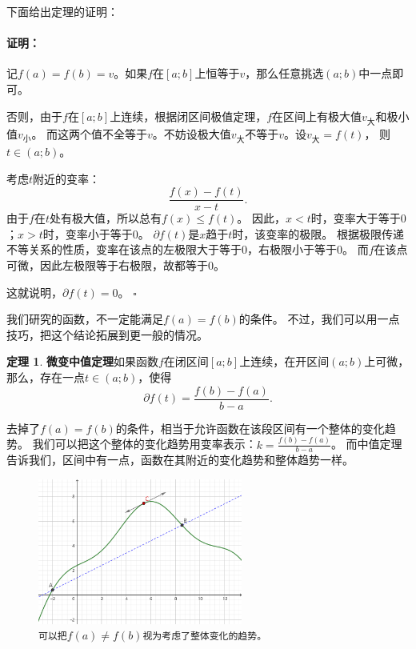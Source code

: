 \documentclass[12pt,UTF8]{ctexbook}
\theoremstyle{definition}
\newtheorem{tm}{定理}[section]
\theoremstyle{plain}
\renewenvironment{proof}{\paragraph{\textbf{证明：}}}{\hfill$\square$}
\begin{document}
下面给出定理的证明：
\begin{proof}
    记$f(a) = f(b) = v$。如果$f$在$[a; b]$上恒等于$v$，那么任意挑选$(a; b)$中一点即可。

    否则，由于$f$在$[a; b]$上连续，根据闭区间极值定理，$f$在区间上有极大值$v_{\text{大}}$和极小值$v_{\text{小}}$。
    而这两个值不全等于$v$。不妨设极大值$v_{\text{大}}$不等于$v$。设$v_{\text{大}} = f(t)$，
    则$t\in(a; b)$。

    考虑$t$附近的变率：
    $$ \frac{f(x) - f(t)}{x - t}. $$
    由于$f$在$t$处有极大值，所以总有$f(x) \leqslant f(t)$。
    因此，$x<t$时，变率大于等于$0$；$x>t$时，变率小于等于$0$。
    $\partial f(t)$是$x$趋于$t$时，该变率的极限。
    根据极限传递不等关系的性质，变率在该点的左极限大于等于$0$，右极限小于等于$0$。
    而$f$在该点可微，因此左极限等于右极限，故都等于$0$。
    
    这就说明，$ \partial f(t) = 0$。
\end{proof}

我们研究的函数，不一定能满足$f(a) = f(b)$的条件。
不过，我们可以用一点技巧，把这个结论拓展到更一般的情况。

\begin{tm}{\textbf{微变中值定理}}\label{tm:2-4-10}
    如果函数$f$在闭区间$[a; b]$上连续，在开区间$(a; b)$上可微，
    那么，存在一点$t\in(a; b)$，使得
    $$ \partial f(t) = \frac{f(b) - f(a)}{b - a}.$$
\end{tm}

去掉了$f(a) = f(b)$的条件，相当于允许函数在该段区间有一个整体的变化趋势。
我们可以把这个整体的变化趋势用变率表示：$k = \frac{f(b) - f(a)}{b - a}$。
而中值定理告诉我们，区间中有一点，函数在其附近的变化趋势和整体趋势一样。

\begin{figure}[h]
    \centering
    \includegraphics[width=0.6\textwidth]{tu/微变中值定理1.png}    
    \caption*{\texttt{可以把}$f(a) \neq f(b)$\texttt{视为考虑了整体变化的趋势。}}
\end{figure}
\end{document}
